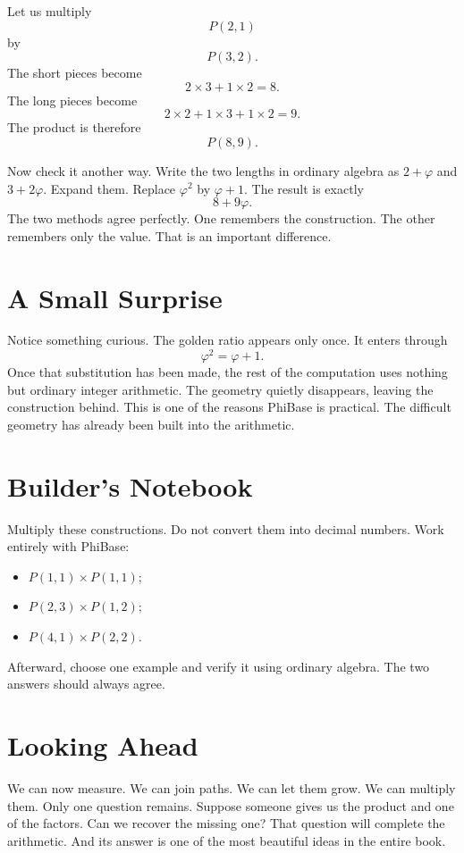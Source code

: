 Let us multiply
\[
P(2,1)
\]
by
\[
P(3,2).
\]
The short pieces become
\[
2\times3 + 1\times2 = 8.
\]
The long pieces become
\[
2\times2 + 1\times3 + 1\times2 = 9.
\]
The product is therefore
\[
P(8,9).
\]

Now check it another way. Write the two lengths in ordinary algebra as \(2+\varphi\) and \(3+2\varphi\). Expand them. Replace \(\varphi^2\) by \(\varphi+1\). The result is exactly
\[
8+9\varphi.
\]
The two methods agree perfectly. One remembers the construction. The other remembers only the value. That is an important difference.

\section*{A Small Surprise}

Notice something curious. The golden ratio appears only once. It enters through
\[
\varphi^2=\varphi+1.
\]
Once that substitution has been made, the rest of the computation uses nothing but ordinary integer arithmetic. The geometry quietly disappears, leaving the construction behind. This is one of the reasons PhiBase is practical. The difficult geometry has already been built into the arithmetic.

\section*{Builder's Notebook}

Multiply these constructions. Do not convert them into decimal numbers. Work entirely with PhiBase:
\begin{itemize}
  \item \(P(1,1)\times P(1,1)\);
  \item \(P(2,3)\times P(1,2)\);
  \item \(P(4,1)\times P(2,2)\).
\end{itemize}
Afterward, choose one example and verify it using ordinary algebra. The two answers should always agree.

\section*{Looking Ahead}

We can now measure. We can join paths. We can let them grow. We can multiply them. Only one question remains. Suppose someone gives us the product and one of the factors. Can we recover the missing one? That question will complete the arithmetic. And its answer is one of the most beautiful ideas in the entire book.
